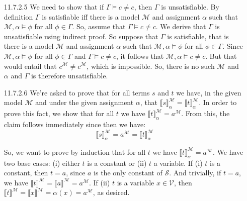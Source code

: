 \begin{itemize}
                    \item[11.7.2.5]We need to show that if $\Gamma\vDash
                      c\neq c$, then $\Gamma$ is unsatisfiable. By
                      definition $\Gamma$ is satisfiable iff there is
                      a model $\mathcal{M}$ and assignment $\alpha$
                      such that $\mathcal{M},\alpha\vDash \phi$ for
                      all $\phi\in\Gamma$. So, assume that $\Gamma\vDash
                      c\neq c$. We derive that $\Gamma$ is
                      unsatisfiable using indirect proof. So suppose
                      that $\Gamma$ is satisfiable, that is there is
                      a model $\mathcal{M}$ and assignment $\alpha$
                      such that $\mathcal{M},\alpha\vDash \phi$ for
                      all $\phi\in\Gamma$. Since $\mathcal{M},\alpha\vDash \phi$ for
                      all $\phi\in\Gamma$ and $\Gamma\vDash c\neq c$,
                      it follows that $\mathcal{M},\alpha\vDash c\neq
                      c$. But that would entail that
                      $c^\mathcal{M}\neq c^\mathcal{M}$, which is
                      impossible. So, there is no such $\mathcal{M}$
                      and $\alpha$ and $\Gamma$ is therefore unsatisfiable.

                  \item[11.7.2.6] We're asked to prove that for all
                    terms $s$ and $t$ we have, in the given model
                    $\mathcal{M}$ and under the given assignment
                    $\alpha$, that $\llbracket
                    s\rrbracket^\mathcal{M}_\alpha=\llbracket
                    t\rrbracket^\mathcal{M}_\alpha$. In order to prove
                    this fact, we show that for all $t$ we have $\llbracket
                    t\rrbracket^\mathcal{M}_\alpha=a^\mathcal{M}$. From
                    this, the claim follows immediately since then we
                    have: \[\llbracket
                    s\rrbracket^\mathcal{M}_\alpha=a^\mathcal{M}=\llbracket
                    t\rrbracket^\mathcal{M}_\alpha\]

                    So, we want to prove by induction that for all $t$ we have $\llbracket
                    t\rrbracket^\mathcal{M}_\alpha=a^\mathcal{M}$. We
                    have two base cases: (i) either $t$ is a constant
                    or (ii) $t$ a variable. If (i) $t$ is a constant, then
                    $t=a$, since $a$ is the only constant of
                    $\mathcal{S}$. And trivially, if $t=a$,  we have
                    $\llbracket t\rrbracket^\mathcal{M}=\llbracket
                    a\rrbracket^\mathcal{M}=a^\mathcal{M}$. If (ii)
                    $t$ is a variable $x\in \mathcal{V}$, then
                    $\llbracket t\rrbracket^\mathcal{M}=\llbracket
                    x\rrbracket^\mathcal{M}=\alpha(x)=a^\mathcal{M}$,
                    as desired.


\end{itemize}
